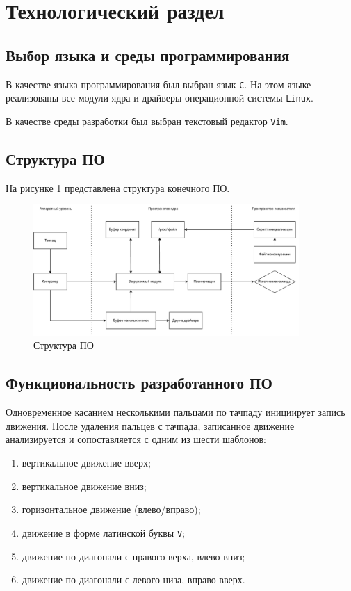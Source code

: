\section{Технологический раздел}
\subsection{Выбор языка и среды программирования}
В качестве языка программирования был выбран язык \texttt{C}. На этом языке реализованы все модули ядра и драйверы операционной системы \texttt{Linux}.

В качестве среды разработки был выбран текстовый редактор \texttt{Vim}.

\subsection{Структура ПО}

На рисунке \ref{fig:arch} представлена структура конечного ПО.

\begin{figure}[H]
	\centering
	\includegraphics[width=0.9\textwidth]{inc/arch.pdf}
	\caption{Структура ПО}
	\label{fig:arch}
\end{figure}

\subsection{Функциональность разработанного ПО}

Одновременное касанием несколькими пальцами по тачпаду инициирует запись движения. После удаления пальцев с тачпада, записанное движение анализируется и сопоставляется с одним из шести шаблонов:
\begin{enumerate}
	\item вертикальное движение вверх;
	\item вертикальное движение вниз;
	\item горизонтальное движение (влево/вправо);
	\item движение в форме латинской буквы \texttt{V};
	\item движение по диагонали с правого верха, влево вниз;
	\item движение по диагонали с левого низа, вправо вверх.
\end{enumerate}

